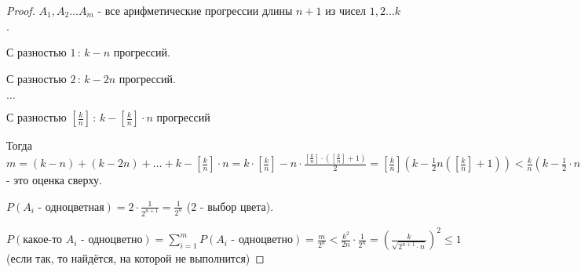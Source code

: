 \begin{proof}
    $A_1, A_2 \ldots A_m$ - все арифметические прогрессии длины $n + 1$ из чисел
    $1, 2 \ldots k$.

    С разностью $1 \, : \, k - n$ прогрессий.

    С разностью $2 \, : \, k - 2n$ прогрессий.

    $\ldots$

    С разностью $[\frac{k}{n}] \, : \, k - [\frac{k}{n}] \cdot n$ прогрессий

    Тогда $m = (k - n) + (k - 2n) + \ldots + k - [\frac{k}{n}] \cdot n = k \cdot [\frac{k}{n}] - n \cdot \frac{[\frac{k}{n}] \cdot ([\frac{k}{n}] + 1)}{2} =
    [\frac{k}{n}] (k - \frac{1}{2}n ([\frac{k}{n}] + 1)) < \frac{k}{n} (k - \frac{1}{2} \cdot n \cdot \frac{k}{n}) = \frac{k^2}{2n}$ - это
    оценка сверху.

    $P(\text{$A_i$ - одноцветная}) = 2 \cdot \frac{1}{2^{n + 1}} = \frac{1}{2^n}$ (2 - выбор цвета).

    $P(\text{какое-то $A_i$ - одноцветно}) = \sum_{i = 1}^m P(\text{$A_i$ - одноцветно}) = \frac{m}{2^n} <
    \frac{k^2}{2n} \cdot \frac{1}{2^n} = (\frac{k}{\sqrt{2^{n + 1} \cdot n}})^2 \leqslant 1$
    (если так, то найдётся, на которой не выполнится)
\end{proof}

